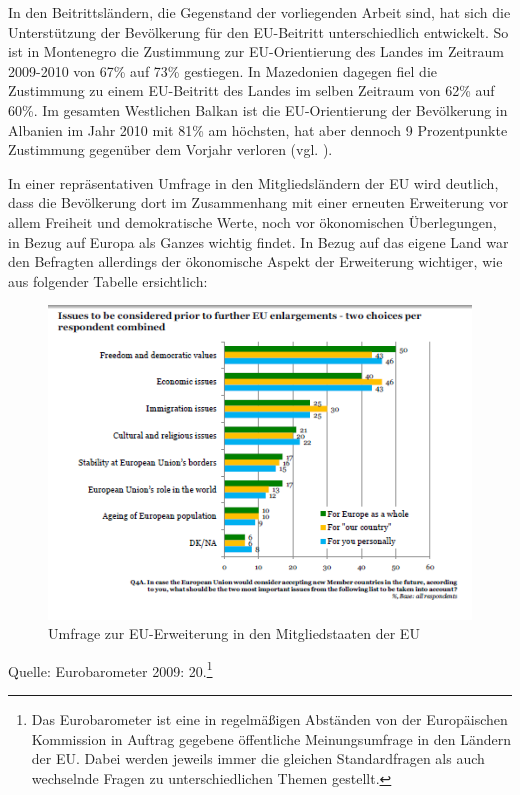 In den Beitrittsländern, die Gegenstand der vorliegenden Arbeit sind, hat sich die Unterstützung der Bevölkerung für den EU-Beitritt unterschiedlich entwickelt. So ist in Montenegro die Zustimmung zur EU-Orientierung des Landes im Zeitraum 2009-2010 von 67\% auf 73\% gestiegen. In Mazedonien dagegen fiel die Zustimmung zu einem EU-Beitritt des Landes im selben Zeitraum von 62\% auf 60\%. Im gesamten Westlichen Balkan ist die EU-Orientierung der Bevölkerung in Albanien im Jahr 2010 mit 81\% am höchsten, hat aber dennoch 9 Prozentpunkte Zustimmung gegenüber dem Vorjahr verloren (vgl. \cite{gallup10}).\par
In einer repräsentativen Umfrage in den Mitgliedsländern der EU wird deutlich, dass die Bevölkerung dort im Zusammenhang mit einer erneuten Erweiterung vor allem Freiheit und demokratische Werte, noch vor ökonomischen Überlegungen, in Bezug auf Europa als Ganzes wichtig findet. In Bezug auf das eigene Land war den Befragten allerdings der ökonomische Aspekt der Erweiterung wichtiger, wie aus folgender Tabelle ersichtlich:
\begin{figure}[H]\centering
\setlength\belowcaptionskip{10pt}
  \caption{Umfrage zur EU-Erweiterung in den Mitgliedstaaten der EU }
  \includegraphics[width=5in]{Material/Umfrage}
\end{figure}
\vspace{-1cm}
{\centering Quelle: Eurobarometer 2009: 20.\footnote{Das Eurobarometer ist eine in regelmäßigen Abständen von der Europäischen Kommission in Auftrag gegebene öffentliche Meinungsumfrage in den Ländern der EU. Dabei werden jeweils immer die gleichen Standardfragen als auch wechselnde Fragen zu unterschiedlichen Themen gestellt.}
  \par
}

